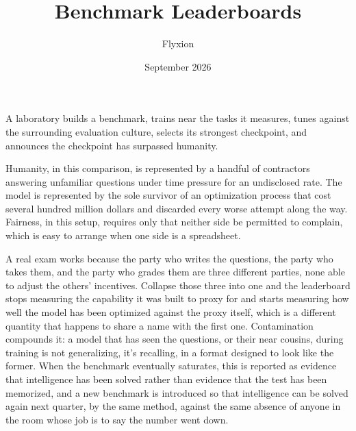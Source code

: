 \documentclass[11pt]{article}
\title{Benchmark Leaderboards}
\author{Flyxion}
\date{September 2026}
\begin{document}
\maketitle

A laboratory builds a benchmark, trains near the tasks it measures, tunes against the surrounding evaluation culture, selects its strongest checkpoint, and announces the checkpoint has surpassed humanity.

Humanity, in this comparison, is represented by a handful of contractors answering unfamiliar questions under time pressure for an undisclosed rate. The model is represented by the sole survivor of an optimization process that cost several hundred million dollars and discarded every worse attempt along the way. Fairness, in this setup, requires only that neither side be permitted to complain, which is easy to arrange when one side is a spreadsheet.

A real exam works because the party who writes the questions, the party who takes them, and the party who grades them are three different parties, none able to adjust the others' incentives. Collapse those three into one and the leaderboard stops measuring the capability it was built to proxy for and starts measuring how well the model has been optimized against the proxy itself, which is a different quantity that happens to share a name with the first one. Contamination compounds it: a model that has seen the questions, or their near cousins, during training is not generalizing, it's recalling, in a format designed to look like the former. When the benchmark eventually saturates, this is reported as evidence that intelligence has been solved rather than evidence that the test has been memorized, and a new benchmark is introduced so that intelligence can be solved again next quarter, by the same method, against the same absence of anyone in the room whose job is to say the number went down.
\end{document}
